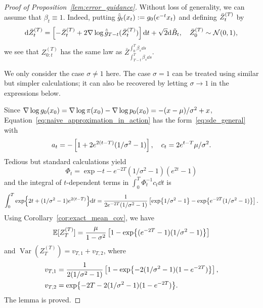 \documentclass{article}
\theoremstyle{plain}
\theoremstyle{definition}
\theoremstyle{remark}
\begin{document}
\begin{proof}[Proof of Proposition~\ref{lem:error_guidance}]
	Without loss of generality, we can assume that $\beta_t \equiv 1$. Indeed, putting $\hat {\bar g}_t(x_t):= g_0(e^{-t} x_t)$ and defining ${\bar Z_t}^{(T)}$ by
	\begin{equation}
		\dd \powertp{\bar Z_t} = \ps{-\powertp{\bar Z_t} + 2 \gradlog \hatbar g_{T-t}(\powertp{\bar Z_t})} \dd t+ \sqrt 2 \dd \tilde B_t, \quad \powertp{\bar Z_0} \sim \mathcal N(0, 1),
	\end{equation}
	we see that $Z_{0:t}^{(T)}$ has the same law as $\bar Z^{\int_0^T \beta_s \dd s}_{\int_{T-t}^T \beta_s \dd s}$.


	We only consider the case $\sigma \neq 1$ here. The case $\sigma = 1$ can be treated using similar but simpler calculations; it can also be recovered by letting $\sigma \to 1$ in the expressions below.

	Since $\nabla\log g_0(x_0) = \nabla\log \pi(x_0) - \nabla\log p_0(x_0) = -(x-\mu)/\sigma^2 + x$, Equation~\eqref{eq:naive_approximation_in_action} has the form~\eqref{eq:sde_general} with
	\begin{equation}
		a_t = -\left[ 1 + 2e^{2(t-T)}(1/\sigma^2 - 1) \right], \quad c_t = 2e^{t-T}\mu/\sigma^2.
	\end{equation}
	Tedious but standard calculations yield
	\begin{equation}
		\Phi_t = \exp{-t - e^{-2T}(1/\sigma^2 - 1)(e^{2t}-1)}
	\end{equation}
	and the integral of $t$-dependent terms in $\int_0^T \Phi_t^{-1} c_t \dd t$ is
	\begin{equation*}
		\int_0^T \exp{2t+(1/\sigma^2-1)e^{2(t-T)}} \dd t = \frac{1}{2e^{-2T}(1/\sigma^2 - 1)} \left[ \exp{1/\sigma^2 - 1} - \exp{e^{-2T}(1/\sigma^2 - 1)} \right].
	\end{equation*}
	Using Corollary~\ref{cor:exact_mean_cov}, we have
	\begin{equation}
		\mathbb{E}[Z_T^{(T)}] = \frac{\mu}{1-\sigma^2} \left[ 1 - \exp{(e^{-2T} - 1)(1/\sigma^2 - 1)} \right]
	\end{equation}
	and $\operatorname{Var}(Z_T^{(T)}) = v_{T, 1} + v_{T, 2}$, where
	\begin{align}
		v_{T, 1} & = \frac{1}{2(1/\sigma^2 - 1)} \left[ 1 - \exp{-2(1/\sigma^2 - 1)(1 - e^{-2T})} \right], \\
		v_{T, 2} & = \exp{-2T-2(1/\sigma^2 - 1)(1-e^{-2T})}.
	\end{align}
	The lemma is proved.
\end{proof}
\end{document}
